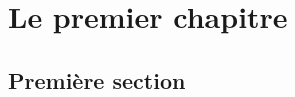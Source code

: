 \chapter{Le premier chapitre}\label{chap:C1}
	\setcounter{section}{0}
	\section{Première section}\label{sec:C1_S1}
	\lipsum[0-5]
\newpage
